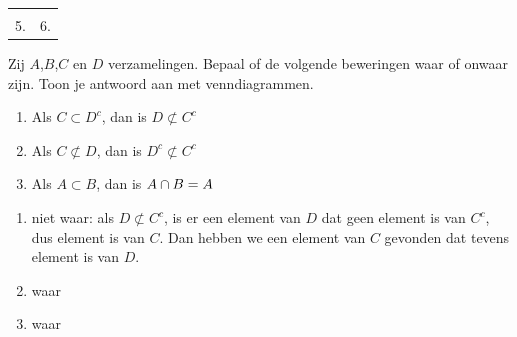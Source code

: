 \begin{oef}
\begin{opl}
{\begin{center}
\begin{tabular}{cc}
\begin{tikzpicture}
    \draw[outline] \ellA;
    \draw[outline] \ellB;
    \labels
  \end{tikzpicture}
  \\
  5.
  \begin{tikzpicture}
    \draw[thick,highlight] \universe;
    \draw[empty] \ellA;
    \draw[empty] \ellB;
    \draw[outline] \ellA;
    \labels
  \end{tikzpicture}
  &
  6.
  \begin{tikzpicture}
    \draw[thick,highlight] \universe;
    \draw[empty] \ellA;
    \draw[empty] \ellB;
    \draw[outline] \ellA;
    \labels
  \end{tikzpicture}
\end{tabular}
\end{center}
}
\end{opl}
\end{oef}



\begin{oef}
Zij $A$,$B$,$C$ en $D$ verzamelingen. Bepaal of de volgende beweringen waar of onwaar zijn. Toon je antwoord aan met venndiagrammen.
\begin{enumerate}
  \item Als $C\subset D^c$, dan is $D \not \subset C^c$
  \item Als $C\not \subset D$, dan is $D^c \not \subset C^c$
  \item Als $A\subset B$, dan is $A\cap B =A$
\end{enumerate}
\begin{opl}
\begin{enumerate}
  \item niet waar: als $D \not \subset C^c$, is er  een element van $D$ dat geen element is van $C^c$, dus element is van $C$. Dan hebben we een element van $C$ gevonden dat tevens element is van $D$.
  \item waar
  \item waar
\end{enumerate}
\end{opl}
\end{oef}


